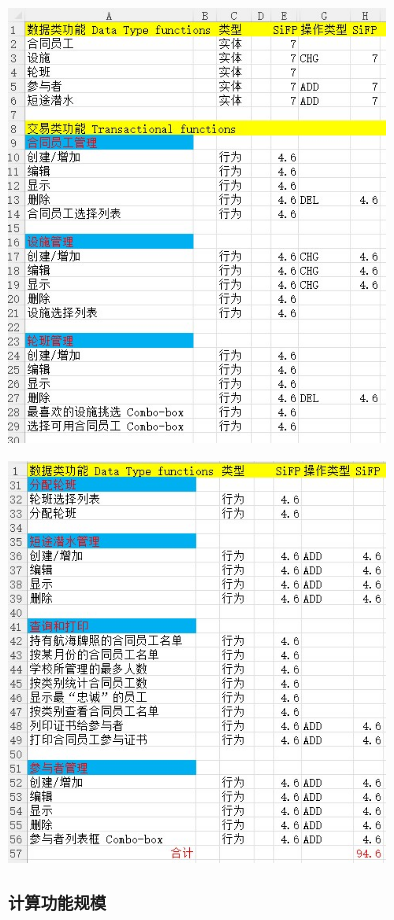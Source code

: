 
\includegraphics[width=10cm]{Ex2XlsScreenshot_2022-04-05_143941.jpg}


\includegraphics[width=10cm]{Ex2XlsPt2of2Screenshot_2022-04-05_143941.jpg}

\hypertarget{ux8ba1ux7b97ux529fux80fdux89c4ux6a21-1}{%
\subsubsection{计算功能规模}\label{ux8ba1ux7b97ux529fux80fdux89c4ux6a21-1}}

